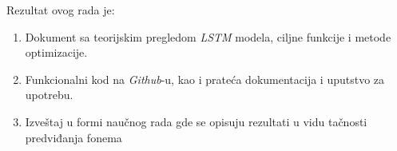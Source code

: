 \documentclass[12pt]{article}
\begin{document}
\hspace{-0.5cm}Rezultat ovog rada je:
\begin{enumerate}
  \item Dokument sa teorijskim pregledom \textit{LSTM} modela, ciljne funkcije i metode optimizacije.
  \item Funkcionalni kod na \textit{Github}-u, kao i prateća dokumentacija i uputstvo za upotrebu.
  \item Izveštaj u formi naučnog rada gde se opisuju rezultati u vidu tačnosti predviđanja fonema

\end{enumerate}
\end{document}
